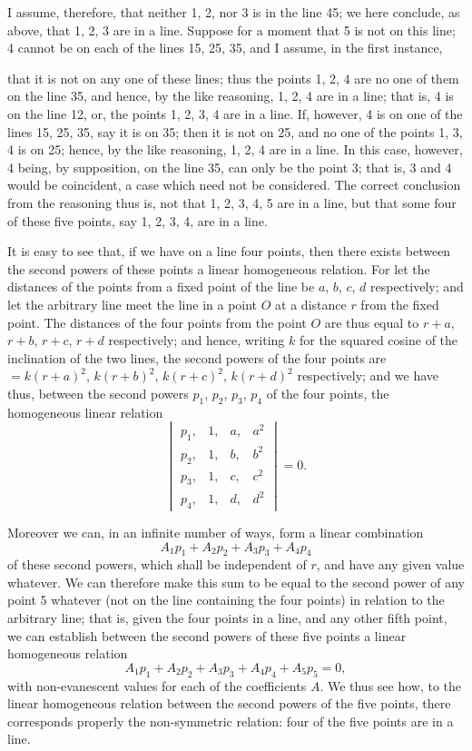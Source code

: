 \documentclass[11pt,a4paper]{article}
\begin{document}
I assume, therefore, that neither 1, 2, nor 3 is in the line 45; we here conclude, as above, that 1, 2, 3 are in a line. Suppose for a moment that 5 is not on this line; 4 cannot be on each of the lines 15, 25, 35, and I assume, in the first instance,

that it is not on any one of these lines; thus the points 1, 2, 4 are no one of them on the line 35, and hence, by the like reasoning, 1, 2, 4 are in a line; that is, 4 is on the line 12, or, the points 1, 2, 3, 4 are in a line. If, however, 4 is on one of the lines 15, 25, 35, say it is on 35; then it is not on 25, and no one of the points 1, 3, 4 is on 25; hence, by the like reasoning, 1, 2, 4 are in a line. In this case, however, 4 being, by supposition, on the line 35, can only be the point 3; that is, 3 and 4 would be coincident, a case which need not be considered. The correct conclusion from the reasoning thus is, not that 1, 2, 3, 4, 5 are in a line, but that some four of these five points, say 1, 2, 3, 4, are in a line.

It is easy to see that, if we have on a line four points, then there exists between the second powers of these points a linear homogeneous relation. For let the distances of the points from a fixed point of the line be $a$, $b$, $c$, $d$ respectively; and let the arbitrary line meet the line in a point $O$ at a distance $r$ from the fixed point. The distances of the four points from the point $O$ are thus equal to $r + a$, $r + b$, $r + c$, $r + d$ respectively; and hence, writing $k$ for the squared cosine of the inclination of the two lines, the second powers of the four points are $= k (r + a)^2$, $k (r + b)^2$, $k (r + c)^2$, $k (r + d)^2$ respectively; and we have thus, between the second powers $p_1$, $p_2$, $p_3$, $p_4$ of the four points, the homogeneous linear relation
\[
\begin{vmatrix}
p_1, & 1, & a, & a^2 \\
p_2, & 1, & b, & b^2 \\
p_3, & 1, & c, & c^2 \\
p_4, & 1, & d, & d^2
\end{vmatrix} = 0.
\]

Moreover we can, in an infinite number of ways, form a linear combination
\[
A_1 p_1 + A_2 p_2 + A_3 p_3 + A_4 p_4
\]
of these second powers, which shall be independent of $r$, and have any given value whatever. We can therefore make this sum to be equal to the second power of any point 5 whatever (not on the line containing the four points) in relation to the arbitrary line; that is, given the four points in a line, and any other fifth point, we can establish between the second powers of these five points a linear homogeneous relation
\[
A_1 p_1 + A_2 p_2 + A_3 p_3 + A_4 p_4 + A_5 p_5 = 0,
\]
with non-evanescent values for each of the coefficients $A$. We thus see how, to the linear homogeneous relation between the second powers of the five points, there corresponds properly the non-symmetric relation: four of the five points are in a line.
\end{document}
